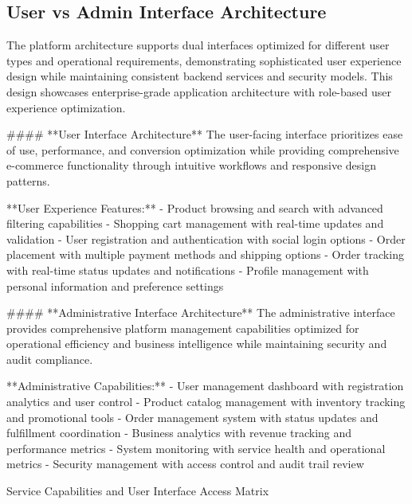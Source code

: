\subsection{User vs Admin Interface Architecture}

The platform architecture supports dual interfaces optimized for different user types and operational requirements, demonstrating sophisticated user experience design while maintaining consistent backend services and security models. This design showcases enterprise-grade application architecture with role-based user experience optimization.

#### **User Interface Architecture**
The user-facing interface prioritizes ease of use, performance, and conversion optimization while providing comprehensive e-commerce functionality through intuitive workflows and responsive design patterns.

**User Experience Features:**
- Product browsing and search with advanced filtering capabilities
- Shopping cart management with real-time updates and validation
- User registration and authentication with social login options
- Order placement with multiple payment methods and shipping options
- Order tracking with real-time status updates and notifications
- Profile management with personal information and preference settings

#### **Administrative Interface Architecture**
The administrative interface provides comprehensive platform management capabilities optimized for operational efficiency and business intelligence while maintaining security and audit compliance.

**Administrative Capabilities:**
- User management dashboard with registration analytics and user control
- Product catalog management with inventory tracking and promotional tools
- Order management system with status updates and fulfillment coordination
- Business analytics with revenue tracking and performance metrics
- System monitoring with service health and operational metrics
- Security management with access control and audit trail review

\begin{table}[H]
\centering
\caption{Service Capabilities and User Interface Access Matrix}
\label{tab:service-capabilities-matrix}
\end{table}







